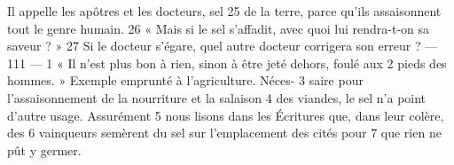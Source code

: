Il appelle les apôtres et les docteurs, sel	 
25	 	de la terre, parce qu'ils assaisonnent tout le genre humain.	 
26	 	« Mais si le sel s'affadit, avec quoi lui rendra-t-on sa saveur ? »	 
27	 	Si le docteur s'égare, quel autre docteur corrigera son erreur ?	 
 	--- 111 ---	 
1	 	« Il n'est plus bon à rien, sinon à être jeté dehors, foulé aux	 
2	 	pieds des hommes. » Exemple emprunté à l'agriculture. Néces-	 
3	 	saire pour l'assaisonnement de la nourriture et la salaison	 
4	 	des viandes, le sel n'a point d'autre usage. Assurément	 
5	 	nous lisons dans les Écritures que, dans leur colère, des	 
6	 	vainqueurs semèrent du sel sur l'emplacement des cités pour	 
7	 	que rien ne pût y germer.